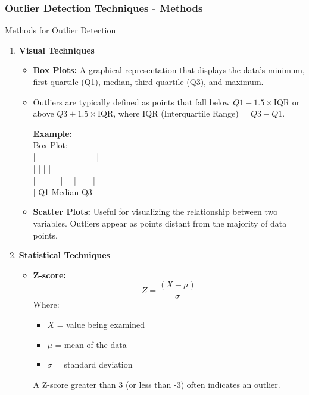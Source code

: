 \documentclass[aspectratio=169]{beamer}
\begin{document}
\begin{frame}[fragile]
    \frametitle{Outlier Detection Techniques - Methods}
    \begin{block}{Methods for Outlier Detection}
        \begin{enumerate}
            \item \textbf{Visual Techniques}
            \begin{itemize}
                \item \textbf{Box Plots:} A graphical representation that displays the data's minimum, first quartile (Q1), median, third quartile (Q3), and maximum. 
                \item Outliers are typically defined as points that fall below $Q1 - 1.5 \times \text{IQR}$ or above $Q3 + 1.5 \times \text{IQR}$, where IQR (Interquartile Range) = $Q3 - Q1$.
                
                \begin{center}
                \textbf{Example:} \\
                Box Plot: \\
                |----------------------|  \\         
                |         |    |      |   \\         
                |---------|----|------|--------- \\
                |         Q1   Median   Q3     |
                \end{center}
                
                \item \textbf{Scatter Plots:} Useful for visualizing the relationship between two variables. Outliers appear as points distant from the majority of data points.
            \end{itemize}
            
            \item \textbf{Statistical Techniques}
            \begin{itemize}
                \item \textbf{Z-score:} 
                \begin{equation}
                    Z = \frac{(X - \mu)}{\sigma}
                \end{equation}
                Where: 
                \begin{itemize}
                    \item $X$ = value being examined
                    \item $\mu$ = mean of the data
                    \item $\sigma$ = standard deviation
                \end{itemize}
                A Z-score greater than 3 (or less than -3) often indicates an outlier.
                

\end{itemize}
\end{enumerate}
\end{block}
\end{frame}
\end{document}
